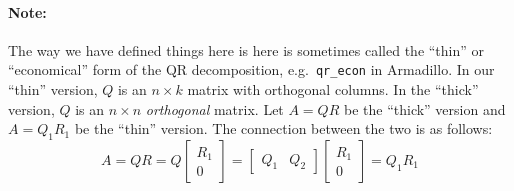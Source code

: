 \documentclass[12pt]{article}
\theoremstyle{definition}
\begin{document}
\paragraph{Note:} The way we have defined things here is here is sometimes called the ``thin'' or ``economical'' form of the QR decomposition, e.g.\ \texttt{qr\_econ} in Armadillo. In our ``thin'' version, $Q$ is an $n\times k$ matrix with orthogonal columns. In the ``thick'' version, $Q$ is an $n\times n$ \emph{orthogonal} matrix. Let $A = QR$ be the ``thick'' version and $A = Q_1 R_1$ be the ``thin'' version. The connection between the two is as follows:
  $$A = QR = Q \left[\begin{array}
    {c} R_1 \\ 0 
  \end{array} \right] = \left[  \begin{array}
    {cc} Q_1 & Q_2
  \end{array}\right]\left[\begin{array}
    {c} R_1 \\ 0 
  \end{array} \right] = Q_1 R_1$$
\end{document}
